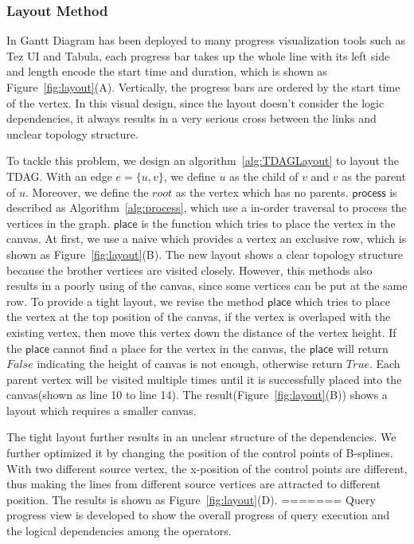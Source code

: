 \subsubsection{Layout Method}
In Gantt Diagram has been deployed to many progress visualization tools such as Tez UI and Tabula, each progress bar takes up the whole line with its left side and length encode the start time and duration, which is shown as Figure~\ref{fig:layout}(A).
Vertically, the progress bars are ordered by the start time of the vertex. In this visual design, since the layout doesn't consider the logic dependencies, it always results in a very serious cross between the links and unclear topology structure.

To tackle this problem, we design an algorithm~\ref{alg:TDAGLayout} to layout the TDAG. With an edge $e=\{u,v\}$, we define $u$ as the child of $v$ and $v$ as the parent of $u$. Moreover, we define the $root$ as the vertex which has no parents. $\mathsf{process}$ is described as Algorithm~\ref{alg:process}, which use a in-order traversal to process the vertices in the graph.  $\mathsf{place}$ is the function which tries to place the vertex in the canvas. At first, we use a naive which provides a vertex an exclusive row, which is shown as Figure~\ref{fig:layout}(B). The new layout shows a clear topology structure because the brother vertices are visited closely. However, this methods also results in a poorly using of the canvas, since some vertices can be put at the same row.  
To provide a tight layout, we revise the method $\mathsf{place}$ which tries to place the vertex at the top position of the canvas, if the vertex is overlaped with the existing vertex, then move this vertex down the distance of the vertex height. If the $\mathsf{place}$ cannot find a place for the vertex in the canvas, the $\mathsf{place}$ will return $False$ indicating the height of canvas is not enough, otherwise return $True$. Each parent vertex will be visited multiple times until it is successfully placed into the canvas(shown as line 10 to line 14). The result(Figure~\ref{fig:layout}(B)) shows a layout which requires a smaller canvas.

The tight layout further results in an unclear structure of the dependencies. We further optimized it by changing the position of the control points of B-splines. With two different source vertex, the x-position of the control points are different, thus making the lines from different source vertices are attracted to different position. The results is shown as Figure~\ref{fig:layout}(D).
=======
Query progress view is developed to show the overall progress of query execution and the logical dependencies among the operators. 

